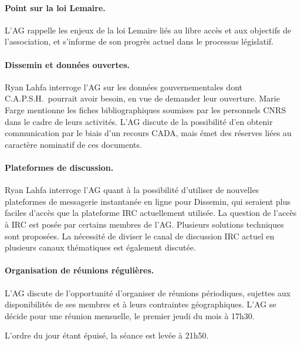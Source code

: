 \documentclass{scrartcl}
\begin{document}
\paragraph{Point sur la loi Lemaire.}
L'AG rappelle les enjeux de la loi Lemaire liés au libre accès et aux objectifs
de l'association, et s'informe de son progrès actuel dans le processus
législatif.

\paragraph{Dissemin et données ouvertes.}
Ryan Lahfa interroge l'AG sur les données gouvernementales dont C.A.P.S.H.\
pourrait avoir besoin, en vue de demander leur ouverture. Marie Farge mentionne
les fiches bibliographiques soumises par les personnels CNRS dans le cadre de
leurs activités. L'AG discute de la
possibilité d'en obtenir communication par le biais d'un recours CADA, mais émet
des réserves liées au caractère nominatif de ces documents.

\paragraph{Plateformes de discussion.}
Ryan Lahfa interroge l'AG quant à la possibilité d'utiliser de nouvelles
plateformes de messagerie instantanée en ligne pour Dissemin, qui
seraient plus faciles d'accès que la plateforme IRC actuellement utilisée. La
question de l'accès à IRC est posée par certains membres de l'AG. Plusieurs
solutions techniques sont proposées. La nécessité de diviser le canal de
discussion IRC actuel en plusieurs canaux thématiques est également discutée.

\paragraph{Organisation de réunions régulières.}
L'AG discute de l'opportunité d'organiser de réunions périodiques, sujettes aux
disponibilités de ses membres et à leurs contraintes géographiques. L'AG se
décide pour une réunion mensuelle, le premier jeudi du mois à 17h30.

\bigskip

L'ordre du jour étant épuisé, la séance est levée à 21h50.
\end{document}
